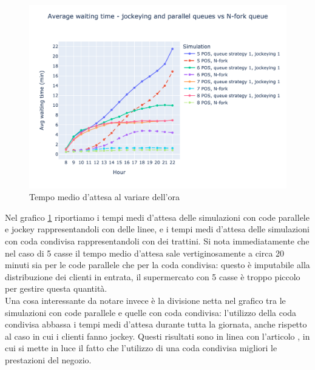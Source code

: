 \begin{figure}[H]
	\centering
	\includegraphics[width=12cm]{"images/results/avg_wt_codacondivisa.png"}

	\caption{Tempo medio d'attesa al variare dell'ora}
	\label{fig:avg_wt_codacondivisa}
\end{figure}

Nel grafico \ref{fig:avg_wt_codacondivisa} riportiamo i tempi medi d'attesa delle simulazioni con code parallele e jockey rappresentandoli con delle linee, e i tempi medi d'attesa delle simulazioni con coda condivisa rappresentandoli con dei trattini. Si nota immediatamente che nel caso di 5 casse il tempo medio d'attesa sale vertiginosamente a circa 20 minuti sia per le code parallele che per la coda condivisa: questo è imputabile alla distribuzione dei clienti in entrata, il supermercato con 5 casse è troppo piccolo per gestire questa quantità. \\
Una cosa interessante da notare invece è la divisione netta nel grafico tra le simulazioni con code parallele e quelle con coda condivisa: l'utilizzo della coda condivisa abbassa i tempi medi d'attesa durante tutta la giornata, anche rispetto al caso in cui i clienti fanno jockey. Questi risultati sono in linea con l'articolo \cite{yanagisawa2011methods}, in cui si mette in luce il fatto che l'utilizzo di una coda condivisa migliori le prestazioni del negozio.

